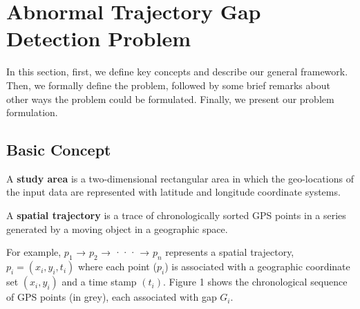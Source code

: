 \documentclass[acmsmall]{acmart}
\begin{document}
\section{Abnormal Trajectory Gap Detection Problem}
\label{section:problemformulation}
In this section, first, we define key concepts and describe our general framework. Then, we formally define the problem, followed by some brief remarks about other ways the problem could be formulated. Finally, we present our problem formulation.



\subsection{Basic Concept}
\label{subsection:basicconcept}

\begin{definition}
A \textbf{study area} is a two-dimensional rectangular area in which the geo-locations of the input data are represented with latitude and longitude coordinate systems.
\end{definition}

\begin{definition}
A \textbf{spatial trajectory} is a trace of chronologically sorted GPS points in a series generated by a moving object in a geographic space.
\end{definition}
For example, $p_1$ → $p_2$ → ··· → $p_n$ represents a spatial trajectory, $p_{i} = (x_{i},y_{i},t_{i})$ where each point ($p_i$) is associated with a geographic coordinate set $(x_{i}, y_{i})$ and a time stamp $(t_{i})$.  Figure 1 shows the chronological sequence of GPS points (in grey), each associated with gap $G_{i}$.
\end{document}
